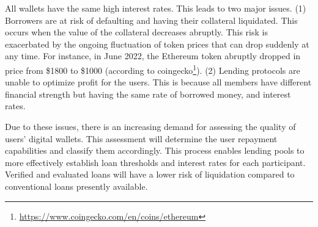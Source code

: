 \documentclass[../ICIT-Paper-2024.tex]{subfiles}
\begin{document}

All wallets have the same high interest rates. This leads to two major issues. 
(1) Borrowers are at risk of defaulting and having their collateral liquidated. This occurs when the value of the collateral decreases abruptly. This risk is exacerbated by the ongoing fluctuation of token prices that can drop suddenly at any time. 
For instance, in June 2022, the Ethereum token abruptly dropped in price from \$1800 to \$1000 (according to coingecko\footnote{\href{https://www.coingecko.com/en/coins/ethereum}{https://www.coingecko.com/en/coins/ethereum}}). (2) Lending protocols are unable to optimize profit for the users. This is because all members have different financial strength but having the same rate of borrowed money, and interest rates.



Due to these issues, there is an increasing demand for assessing the quality of users' digital wallets. This assessment will determine the user repayment capabilities and classify them accordingly. This process enables lending pools to more effectively establish loan thresholds and interest rates for each participant. Verified and evaluated loans will have a lower risk of liquidation compared to conventional loans presently available.
\end{document}
